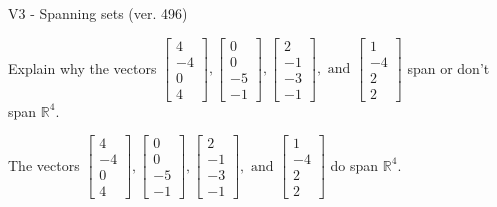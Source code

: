 \begin{exercise}
  \begin{exerciseTitle}V3 - Spanning sets (ver. 496)\end{exerciseTitle}
  \begin{exerciseStatement}
    Explain why the vectors \(\left[\begin{array}{r}
4 \\
-4 \\
0 \\
4
\end{array}\right] , \left[\begin{array}{r}
0 \\
0 \\
-5 \\
-1
\end{array}\right] , \left[\begin{array}{r}
2 \\
-1 \\
-3 \\
-1
\end{array}\right] , \text{ and } \left[\begin{array}{r}
1 \\
-4 \\
2 \\
2
\end{array}\right]\) span or don't span \(\mathbb{R}^4\). 
	


  \end{exerciseStatement}
  \begin{exerciseAnswer}
   The vectors \(\left[\begin{array}{r}
4 \\
-4 \\
0 \\
4
\end{array}\right] , \left[\begin{array}{r}
0 \\
0 \\
-5 \\
-1
\end{array}\right] , \left[\begin{array}{r}
2 \\
-1 \\
-3 \\
-1
\end{array}\right] , \text{ and } \left[\begin{array}{r}
1 \\
-4 \\
2 \\
2
\end{array}\right]\) 
  	 do  
	span \(\mathbb{R}^4\).
  


  \end{exerciseAnswer}
\end{exercise}